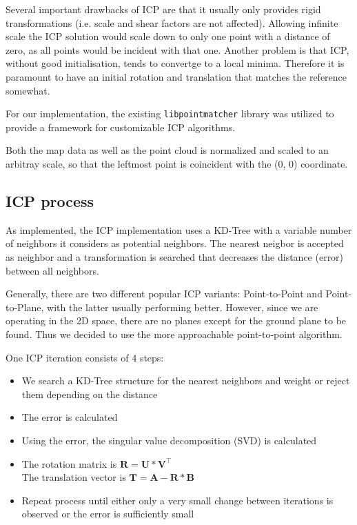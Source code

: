 \documentclass[10pt,twocolumn,letterpaper]{article}
\newcommand{\matr}[1]{\mathbf{#1}} %
\begin{document}
Several important drawbacks of ICP are that it usually only provides rigid transformations (i.e. scale and shear factors are not affected). Allowing infinite scale the ICP solution would scale down to only one point with a distance of zero, as all points would be incident with that one. Another problem is that ICP, without good initialisation, tends to convertge to a local minima. Therefore it is paramount to have an initial rotation and translation that matches the reference somewhat. %

For our implementation, the existing \texttt{libpointmatcher}\cite{Pomerleau12comp} library was utilized to provide a framework for customizable ICP algorithms.

Both the map data as well as the point cloud is normalized and scaled to an arbitray scale, so that the leftmost point is coincident with the (0, 0) coordinate.

\subsection{ICP process}

As implemented, the ICP implementation uses a KD-Tree with a variable number of neighbors it considers as potential neighbors. The nearest neigbor is accepted as neighbor and a transformation is searched that decreases the distance (error) between all neighbors. 

Generally, there are two different popular ICP variants: Point-to-Point and Point-to-Plane, with the latter usually performing better. However, since we are operating in the 2D space, there are no planes except for the ground plane to be found. Thus we decided to use the more approachable point-to-point algorithm.

One ICP iteration consists of 4 steps:

\begin{itemize}
   \item We search a KD-Tree structure for the nearest neighbors and weight or reject them depending on the distance
   \item The error is calculated
   \item Using the error, the singular value decomposition (SVD) is calculated
   \item The rotation matrix is $\matr{R} =\matr{U} * \matr{V}^{\intercal}$
      \\ The translation vector is $\matr{T} = \matr{A} - \matr{R} * \matr{B}$
      \item Repeat process until either only a very small change between iterations is observed or the error is sufficiently small
\end{itemize}
\end{document}
